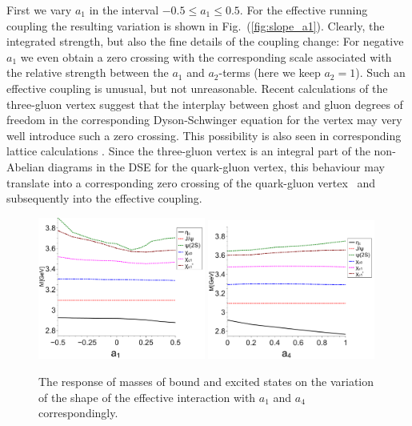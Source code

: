 First we vary $a_1$ in the interval
$-0.5 \le a_1 \le 0.5$. For the effective running coupling the resulting variation
is shown in Fig.~(\ref{fig:slope_a1}). Clearly, the integrated strength, but
also the fine details of the coupling change: For negative $a_1$ we even obtain 
a zero crossing with the corresponding scale associated with the relative
strength between the $a_1$ and $a_2$-terms (here we keep $a_2=1$). Such an 
effective coupling is unusual, but not unreasonable. Recent calculations of 
the three-gluon vertex \cite{Aguilar:2013vaa,Blum:2014gna,Eichmann:2014xya} suggest that the interplay between 
ghost and gluon degrees of freedom in the corresponding Dyson-Schwinger equation 
for the vertex may very well introduce such a zero crossing. This possibility is also 
seen in corresponding lattice calculations \cite{Cucchieri:2008qm}. Since the three-gluon 
vertex is an integral part of the non-Abelian diagrams in the DSE for the quark-gluon vertex, 
this behaviour may translate into a corresponding zero crossing of the quark-gluon 
vertex~\cite{Williams:2014iea} and subsequently into the effective coupling.  
 \begin{figure}[!t]
  \begin{center}
    \includegraphics[width=0.49\textwidth]{figures/trend_a1_CC}
    \includegraphics[width=0.49\textwidth]{figures/trend_a4_CC} 
    \caption{The response of masses of bound and excited states on the variation of the shape 
             of the effective interaction with $a_1$ and $a_4$ correspondingly.}
    \label{fig:trend_a1}
  \end{center}
\end{figure} \\

